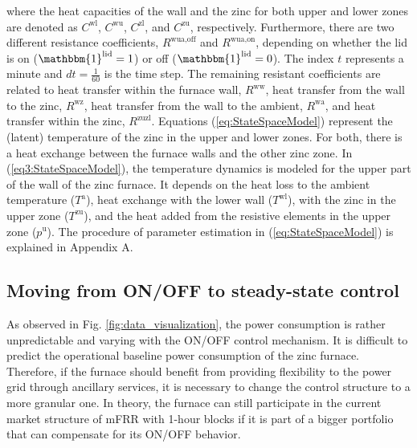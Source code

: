 \documentclass[conference]{IEEEtran}
\begin{document}
where the heat capacities of the wall and the zinc for both upper and lower zones are denoted as $C^{\text{wl}}$, $C^{\text{wu}}$, $C^{\text{zl}}$, and $C^{\text{zu}}$, respectively. Furthermore, there are two different resistance coefficients, $R^{\text{wua},\text{off}}$ and $R^{\text{wua},\text{on}}$, depending on whether the lid is on ($ \mathbbm{1}^{\text{lid}} = 1$) or off ($ \mathbbm{1}^{\text{lid}} = 0$). The index $t$ represents a minute and $dt = \frac{1}{60}$ is the time step. The remaining resistant coefficients are related to heat transfer within the furnace wall, $R^{\text{ww}}$, heat transfer from the wall to the zinc, $R^{\text{wz}}$, heat transfer from the wall to the ambient, $R^{\text{wa}}$, and heat transfer within the zinc, $R^{\text{zuzl}}$. Equations (\ref{eq:StateSpaceModel})  represent the (latent) temperature of the zinc in the upper and lower zones. For both, there is a heat exchange between the furnace walls and the other zinc zone. In (\ref{eq3:StateSpaceModel}), the temperature dynamics is modeled for the upper part of the wall of the zinc furnace. It depends on the heat loss to the ambient temperature ($T^{\text{a}}$), heat exchange with the lower wall ($T^{\text{wl}}$), with the zinc in the upper zone ($T^{\text{zu}}$), and the heat added from the resistive elements in the upper zone  ($p^{\text{u}}$).   The procedure of parameter estimation in (\ref{eq:StateSpaceModel}) is explained in Appendix A.

\vspace{1mm}
\subsection{Moving from ON/OFF to steady-state control}
\vspace{-1mm}
As observed in Fig. \ref{fig:data_visualization}, the power consumption is rather unpredictable and varying with the ON/OFF control mechanism. It is difficult to predict the operational baseline power consumption of the zinc furnace. Therefore, if the furnace should benefit from providing flexibility to the power grid through ancillary services, it is necessary to change the control structure to a more granular one. In theory, the furnace can still participate in the current market structure of mFRR with 1-hour blocks if it is part of a bigger portfolio that can compensate for its ON/OFF behavior.
\end{document}
